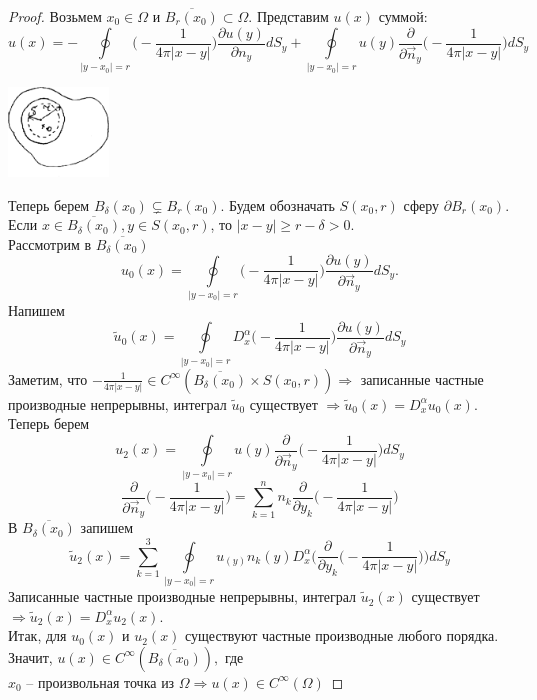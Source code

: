 \begin{proof}
Возьмем $x_0 \in \Omega$ и $\overline{B_r(x_0)} \subset \Omega$. Представим $u(x)$ суммой: $$u(x)= - \oint\limits_{|y-x_0|=r} \bigg( -\frac{1}{4\pi |x-y|} \bigg) \frac{\partial u(y)}{\partial {n_y}} dS_y + \oint\limits_{|y-x_0|=r} u(y) \frac{\partial}{\partial \vec{n}_y} \bigg(-\frac{1}{4\pi |x-y|}\bigg) dS_y $$
\begin{center}
\includegraphics[width=0.2\textwidth]{21_1_new}
\end{center}
Теперь берем $B_{\delta}(x_0) \subsetneq B_{r}(x_0).$ Будем обозначать $S(x_0,r)$ сферу $\partial B_r(x_0).$ Если $x \in \overline{B_{\delta}(x_0)}, y \in S(x_0,r)$, то $|x-y| \geq r - \delta > 0.$\\
Рассмотрим в $\overline{B_{\delta}(x_0)}$ $$u_0(x)= \oint\limits_{|y-x_0|=r} \bigg( -\frac{1}{4\pi |x-y|} \bigg) \frac{\partial u(y)}{\partial \vec{n}_y} dS_y.$$
Напишем $$\tilde{u}_0(x) = \oint\limits_{|y-x_0|=r} D_x^\alpha \bigg( -\frac{1}{4\pi |x-y|} \bigg) \frac{\partial u(y)}{\partial \vec{n}_y} dS_y$$
Заметим, что $-\frac{1}{4\pi |x-y|} \in C^{\infty}( \overline{B_{\delta}(x_0)} \times S(x_0,r)) \Rightarrow$ записанные частные производные непрерывны, интеграл $\tilde{u}_0$ существует $\Rightarrow \tilde{u}_0(x) = D_x^\alpha u_0(x).$\\
Теперь берем $$u_2(x) = \oint\limits_{|y-x_0|=r} u(y) \frac{\partial}{\partial \vec{n}_y} \bigg(-\frac{1}{4\pi |x-y|}\bigg) dS_y$$ 
$$\frac{\partial}{\partial \vec{n}_y} \bigg(-\frac{1}{4\pi |x-y|}\bigg) = \sum_{k=1}^n n_k \frac{\partial}{\partial y_k} \bigg(-\frac{1}{4\pi |x-y|}\bigg)$$ В $\overline{B_{\delta}(x_0)}$ запишем 
$$\tilde{u}_2(x)=\sum_{k=1}^3 \oint\limits_{|y-x_0|=r} u_(y) n_k (y) D_x^\alpha \bigg(\frac{\partial}{\partial y_k} \bigg(-\frac{1}{4\pi |x-y|}\bigg)\bigg)dS_y$$
Записанные частные производные непрерывны, интеграл $\tilde{u}_2(x)$ существует $\Rightarrow \tilde{u}_2(x)=D_x^\alpha u_2(x).$\\
Итак, для $u_0(x)$ и $u_2(x)$ существуют частные производные любого порядка. Значит, $u(x) \in  C^{\infty}( \overline{B_{\delta}(x_0)}),$ где\\ $x_0$ -- произвольная точка из $\Omega \Rightarrow u(x) \in C^{\infty}(\Omega)$
\end{proof}
